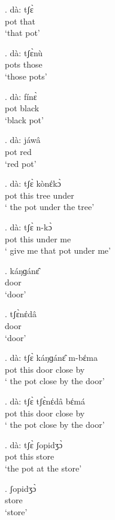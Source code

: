 \documentclass{assets/fieldnotes}
\begin{document}

\exg. dà: tʃɛ̀ \\
 pot that\\
`that pot'


\exg. dà: tʃɛ̀nù \\
 pots those\\
`those pots'


\exg. dà: fínɛ̀\\
 pot black\\
`black pot'

\exg. dà: jáwâ\\
 pot red\\
`red pot'

\exg. dà: tʃɛ̀ kònέkɔ̀\\
  pot this tree under\\
` the pot under the tree'

\exg. dà: tʃɛ̀ n-kɔ̀\\
 pot this under me\\
` give me that pot under me'

\exg. káŋɡánɛ̂\\
door\\
`door'

\exg. tʃɛ̀nέdâ\\
door\\
`door'

\exg. dà: tʃɛ̀ káŋɡánɛ̂ m-bέma\\
 pot this door close by  \\
` the pot close by the door'

\exg. dà: tʃɛ̀ tʃɛ̀nέdâ bέmá\\
 pot this door close by \\
` the pot close by the door'

\exg. dà: tʃɛ̀  ʃopidʒɔ̀ \\
 pot this store\\
`the pot at the store'


\exg. ʃopidʒɔ̀\\
store\\
`store'
\end{document}
